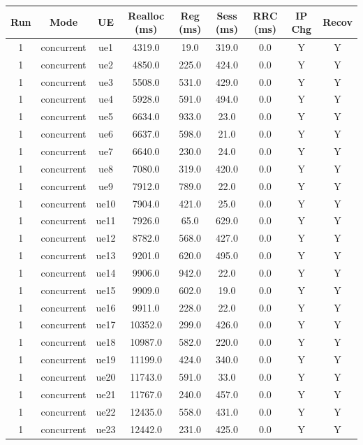 \begin{table}[ht]
\centering
\begin{tabular}{|c|c|c|c|c|c|c|c|c|}
\hline
Run & Mode & UE & Realloc (ms) & Reg (ms) & Sess (ms) & RRC (ms) & IP Chg & Recov \\
\hline
1 & concurrent & ue1 & 4319.0 & 19.0 & 319.0 & 0.0 & Y & Y \\
1 & concurrent & ue2 & 4850.0 & 225.0 & 424.0 & 0.0 & Y & Y \\
1 & concurrent & ue3 & 5508.0 & 531.0 & 429.0 & 0.0 & Y & Y \\
1 & concurrent & ue4 & 5928.0 & 591.0 & 494.0 & 0.0 & Y & Y \\
1 & concurrent & ue5 & 6634.0 & 933.0 & 23.0 & 0.0 & Y & Y \\
1 & concurrent & ue6 & 6637.0 & 598.0 & 21.0 & 0.0 & Y & Y \\
1 & concurrent & ue7 & 6640.0 & 230.0 & 24.0 & 0.0 & Y & Y \\
1 & concurrent & ue8 & 7080.0 & 319.0 & 420.0 & 0.0 & Y & Y \\
1 & concurrent & ue9 & 7912.0 & 789.0 & 22.0 & 0.0 & Y & Y \\
1 & concurrent & ue10 & 7904.0 & 421.0 & 25.0 & 0.0 & Y & Y \\
1 & concurrent & ue11 & 7926.0 & 65.0 & 629.0 & 0.0 & Y & Y \\
1 & concurrent & ue12 & 8782.0 & 568.0 & 427.0 & 0.0 & Y & Y \\
1 & concurrent & ue13 & 9201.0 & 620.0 & 495.0 & 0.0 & Y & Y \\
1 & concurrent & ue14 & 9906.0 & 942.0 & 22.0 & 0.0 & Y & Y \\
1 & concurrent & ue15 & 9909.0 & 602.0 & 19.0 & 0.0 & Y & Y \\
1 & concurrent & ue16 & 9911.0 & 228.0 & 22.0 & 0.0 & Y & Y \\
1 & concurrent & ue17 & 10352.0 & 299.0 & 426.0 & 0.0 & Y & Y \\
1 & concurrent & ue18 & 10987.0 & 582.0 & 220.0 & 0.0 & Y & Y \\
1 & concurrent & ue19 & 11199.0 & 424.0 & 340.0 & 0.0 & Y & Y \\
1 & concurrent & ue20 & 11743.0 & 591.0 & 33.0 & 0.0 & Y & Y \\
1 & concurrent & ue21 & 11767.0 & 240.0 & 457.0 & 0.0 & Y & Y \\
1 & concurrent & ue22 & 12435.0 & 558.0 & 431.0 & 0.0 & Y & Y \\
1 & concurrent & ue23 & 12442.0 & 231.0 & 425.0 & 0.0 & Y & Y \\

\end{tabular}
\end{table}
